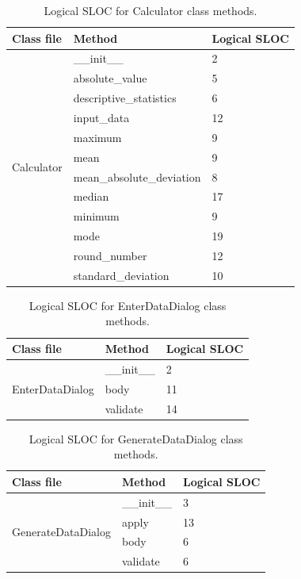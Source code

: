 \documentclass[english,12pt,a4paper]{report}
\begin{document}
	\begin{table}[htbp]
		\centering
		\begin{tabular}{|m{3cm}|m{5cm}|m{2cm}|}
			\hline
			\textbf{Class file} & \textbf{Method} & \textbf{Logical SLOC} \\
			\hline
			\multirow{12}{*}{Calculator} & \_\_init\_\_ & 2 \\
			\cline{2-3}
			& absolute\_value & 5 \\
			\cline{2-3}
			& descriptive\_statistics & 6 \\
			\cline{2-3}
			& input\_data & 12 \\
			\cline{2-3}
			& maximum & 9 \\
			\cline{2-3}
			& mean & 9 \\
			\cline{2-3}
			& mean\_absolute\_deviation & 8 \\
			\cline{2-3}
			& median & 17 \\
			\cline{2-3}
			& minimum & 9 \\
			\cline{2-3}
			& mode & 19 \\
			\cline{2-3}
			& round\_number & 12 \\
			\cline{2-3}
			& standard\_deviation & 10 \\
			\hline
		\end{tabular}
		\caption{Logical SLOC for Calculator class methods.}
	\end{table}
	
	\begin{table}[htbp]
		\centering
		\begin{tabular}{|m{4cm}|m{4cm}|m{2cm}|}
			\hline
			\textbf{Class file} & \textbf{Method} & \textbf{Logical SLOC} \\
			\hline
			\multirow{3}{*}{EnterDataDialog} & \_\_init\_\_ & 2 \\
			\cline{2-3}
			& body & 11 \\
			\cline{2-3}
			& validate & 14 \\
			\hline
		\end{tabular}
		\caption{Logical SLOC for EnterDataDialog class methods.}
	\end{table}
	
	\begin{table}[htbp]
		\centering
		\begin{tabular}{|m{4cm}|m{4cm}|m{2cm}|}
			\hline
			\textbf{Class file} & \textbf{Method} & \textbf{Logical SLOC} \\
			\hline
			\multirow{4}{*}{GenerateDataDialog} & \_\_init\_\_ & 3 \\
			\cline{2-3}
			& apply & 13 \\
			\cline{2-3}
			& body & 6 \\
			\cline{2-3}
			& validate & 6 \\
			\hline
		\end{tabular}
		\caption{Logical SLOC for GenerateDataDialog class methods.}
	\end{table}
	
\end{document}
